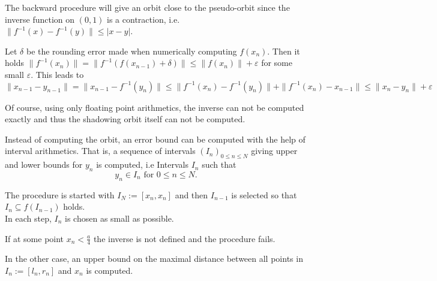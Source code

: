     The backward procedure will give an orbit close to the pseudo-orbit since the
    inverse function on $(0,1)$ is a contraction, i.e. $\| f^{-1}(x) -
    f^{-1}(y) \| \leq |x-y|$. 

    Let $\delta$ be the rounding error made when numerically computing
    $f(x_n)$.
    Then it holds $\|f^{-1}(x_n)\| = \| f^{-1}(f(x_{n-1})+\delta)\| \leq \|f(x_n)\| +
    \varepsilon$ for some small $\varepsilon$.   
    This leads to
    $$ \| x_{n-1} - y_{n-1} \| = \| x_{n-1} - f^{-1}(y_n) \| \leq \|
    f^{-1}(x_n) - f^{-1}(y_n) \| + \| f^{-1}(x_n) - x_{n-1} \| \leq \| x_n -
    y_n \| + \varepsilon $$   

    Of course, using only floating point arithmetics, the inverse can not be
    computed exactly and thus the shadowing orbit itself can not be computed.

    Instead of computing the orbit, an error bound can be computed with the
    help of interval arithmetics. 
    That is, a sequence of intervals $(I_n)_{0 \leq n \leq N}$ giving upper and
    lower bounds for $y_n$ is computed, i.e Intervals $I_n$ such that
    $$y_n \in I_n \text{ for } 0 \leq n \leq N.$$

    The procedure is started with $I_N := [x_n, x_n]$ and then $I_{n-1}$ is
    selected so that $I_n \subseteq f(I_{n-1})$ holds.\\
    In each step, $I_n$ is chosen as small as possible. 

    If at some point $x_n < \frac{a}{4}$ the inverse is not defined and the
    procedure fails.
    
    In the other case, an upper bound on the maximal distance between all points in
    $I_n := [l_n, r_n]$ and $x_n$ is computed.

